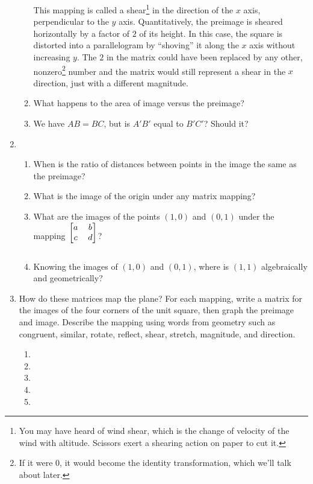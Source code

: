 \documentclass[../gatm.tex]{subfiles}
\begin{document}
\begin{enumerate}
\begin{enumerate}
This mapping is called a shear\footnote{You may have heard of wind shear, which is the change of velocity of the wind with altitude. Scissors exert a shearing action on paper to cut it.} in the direction of the $x$ axis, perpendicular to the $y$ axis. Quantitatively, the preimage is sheared horizontally by a factor of $2$ of its height.  In this case, the square is distorted into a parallelogram by ``shoving'' it along the $x$ axis without increasing $y$. The $2$ in the matrix could have been replaced by any other, nonzero\footnote{If it were $0$, it would become the identity transformation, which we'll talk about later.} number and the matrix would still represent a shear in the $x$ direction, just with a different magnitude.
\item What happens to the area of image versus the preimage?
\item We have $AB=BC$, but is $A'B'$ equal to $B'C'$? Should it?
\end{enumerate}
\item \begin{enumerate}
\item When is the ratio of distances between points in the image the same as the preimage?
\item What is the image of the origin under any matrix mapping?
\item What are the images of the points $(1,0)$ and $(0,1)$ under the mapping $\begin{blockarray}{[cc]} a & b \\ c & d \end{blockarray}$?
\item Knowing the images of $(1,0)$ and $(0,1)$, where is $(1,1)$ algebraically and geometrically?
\end{enumerate}
\item How do these matrices map the plane? For each mapping, write a matrix for the images of the four corners of the unit square, then graph the preimage and image. Describe the mapping using words from geometry such as congruent, similar, rotate, reflect, shear, stretch, magnitude, and direction.
\begin{multicols}{4}
\begin{enumerate}
\item {}
\item {}
\item {}
\item {}
\item {}

\end{enumerate}
\end{multicols}
\end{enumerate}
\end{document}
